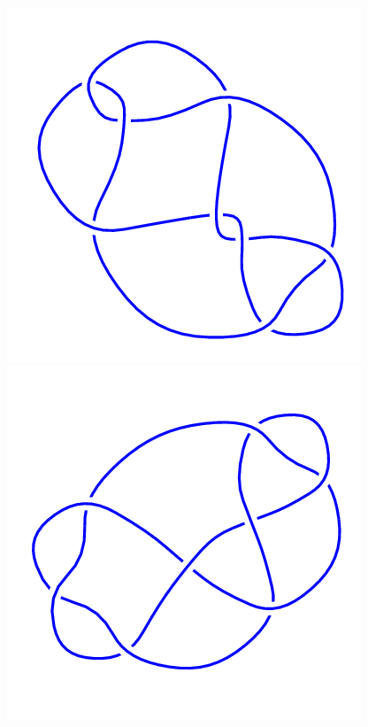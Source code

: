 \begin{figure}[H]
	\begin{minipage}[b]{.18\linewidth}
		\centering
		\includegraphics[width=\linewidth]{../data/8_12.png}
	\end{minipage}
	\begin{minipage}[b]{.18\linewidth}
		\centering
		\includegraphics[width=\linewidth]{../data/8_13.png}

\end{minipage}
\end{figure}
